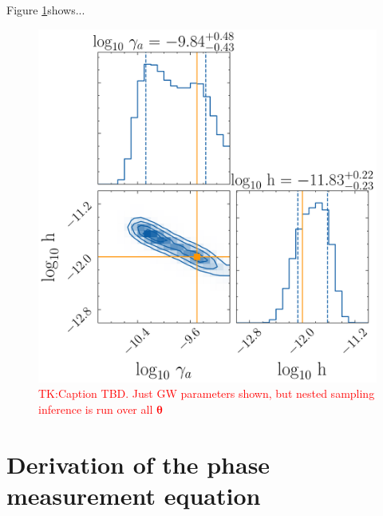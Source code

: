 \documentclass[fleqn,usenatbib,useAMS]{mnras}
\begin{document}
Figure \ref{fig:corner}shows...
\begin{figure}
	\includegraphics[width=\textwidth, height =\textwidth]{images/example_corner_plot} 	
	\caption{\textcolor{red}{TK:Caption TBD. Just GW parameters shown, but nested sampling inference is run over all $\boldsymbol{\theta}$}}
	\label{fig:corner}
\end{figure}















\newpage 
\appendix
\section{Derivation of the phase measurement equation}\label{appendix:measurement_equation_deriv}
\end{document}
